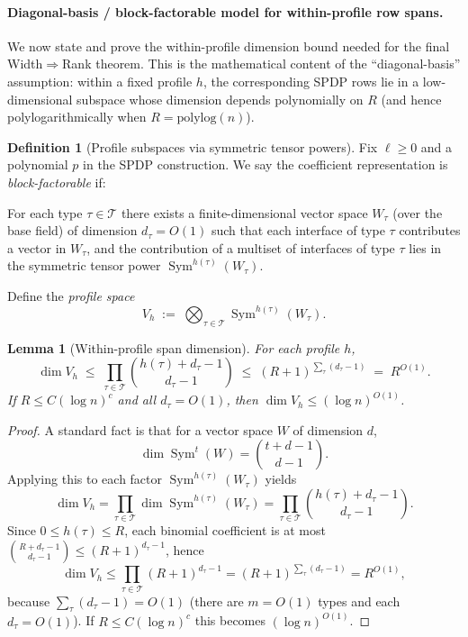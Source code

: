 \documentclass[12pt]{article}
\newcommand{\polylog}{\mathrm{polylog}}
\DeclareMathOperator{\Sym}{Sym}
\newtheorem{lemma}[theorem]{Lemma}
\theoremstyle{definition}
\newtheorem{definition}{Definition}
\theoremstyle{definition}
\theoremstyle{remark}
\theoremstyle{remark}
\begin{document}
\paragraph{Diagonal-basis / block-factorable model for within-profile row spans.}
We now state and prove the within-profile dimension bound needed for the final
Width$\Rightarrow$Rank theorem. This is the mathematical content of the
``diagonal-basis'' assumption: within a fixed profile $h$, the corresponding SPDP
rows lie in a low-dimensional subspace whose dimension depends polynomially on $R$
(and hence polylogarithmically when $R=\polylog(n)$).

\begin{definition}[Profile subspaces via symmetric tensor powers]
\label{def:profile-subspace}
Fix $\ell\ge 0$ and a polynomial $p$ in the SPDP construction.
We say the coefficient representation is \emph{block-factorable} if:

For each type $\tau\in\mathcal{T}$ there exists a finite-dimensional vector space
$W_\tau$ (over the base field) of dimension $d_\tau=O(1)$ such that each interface of
type $\tau$ contributes a vector in $W_\tau$, and the contribution of a multiset of
interfaces of type $\tau$ lies in the symmetric tensor power $\Sym^{h(\tau)}(W_\tau)$.

Define the \emph{profile space}
\[
  V_h
  \;:=\;
  \bigotimes_{\tau\in\mathcal{T}} \Sym^{h(\tau)}(W_\tau).
\]
\end{definition}

\begin{lemma}[Within-profile span dimension]
\label{lem:within-profile-dim}
For each profile $h$,
\[
  \dim V_h
  \;\le\;
  \prod_{\tau\in\mathcal{T}} \binom{h(\tau)+d_\tau-1}{d_\tau-1}
  \;\le\;
  (R+1)^{\sum_{\tau}(d_\tau-1)}
  \;=\;
  R^{O(1)}.
\]
If $R\le C(\log n)^c$ and all $d_\tau=O(1)$, then $\dim V_h \le (\log n)^{O(1)}$.
\end{lemma}

\begin{proof}
A standard fact is that for a vector space $W$ of dimension $d$,
\[
  \dim \Sym^t(W) = \binom{t+d-1}{d-1}.
\]
Applying this to each factor $\Sym^{h(\tau)}(W_\tau)$ yields
\[
  \dim V_h
  =
  \prod_{\tau\in\mathcal{T}} \dim \Sym^{h(\tau)}(W_\tau)
  =
  \prod_{\tau\in\mathcal{T}} \binom{h(\tau)+d_\tau-1}{d_\tau-1}.
\]
Since $0\le h(\tau)\le R$, each binomial coefficient is at most
$\binom{R+d_\tau-1}{d_\tau-1}\le (R+1)^{d_\tau-1}$, hence
\[
  \dim V_h
  \le
  \prod_{\tau\in\mathcal{T}} (R+1)^{d_\tau-1}
  =
  (R+1)^{\sum_\tau (d_\tau-1)}
  =
  R^{O(1)},
\]
because $\sum_\tau(d_\tau-1)=O(1)$ (there are $m=O(1)$ types and each $d_\tau=O(1)$).
If $R\le C(\log n)^c$ this becomes $(\log n)^{O(1)}$.
\end{proof}
\end{document}
